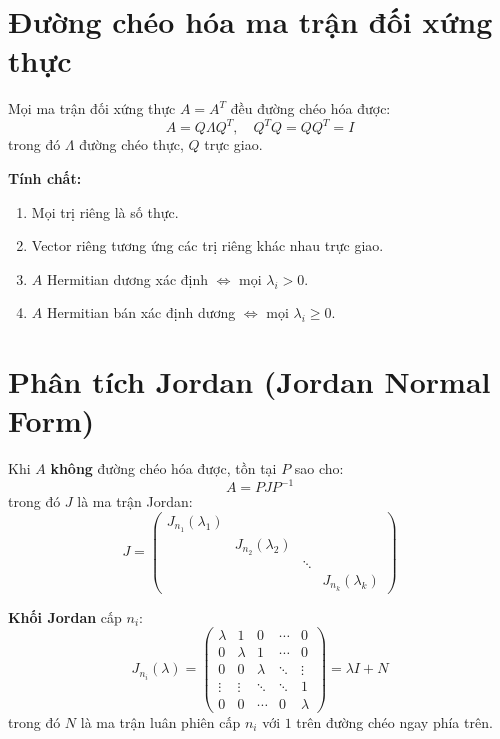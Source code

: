 \section{Đường chéo hóa ma trận đối xứng thực}

Mọi ma trận đối xứng thực $A = A^T$ đều đường chéo hóa được:
\[
A = Q\Lambda Q^T, \quad Q^TQ = QQ^T = I
\]
trong đó $\Lambda$ đường chéo thực, $Q$ trực giao.

\textbf{Tính chất:}
\begin{enumerate}
    \item Mọi trị riêng là số thực.
    \item Vector riêng tương ứng các trị riêng khác nhau trực giao.
    \item $A$ Hermitian dương xác định $\Longleftrightarrow$ mọi $\lambda_i > 0$.
    \item $A$ Hermitian bán xác định dương $\Longleftrightarrow$ mọi $\lambda_i \ge 0$.
\end{enumerate}

\section{Phân tích Jordan (Jordan Normal Form)}

Khi $A$ \textbf{không} đường chéo hóa được, tồn tại $P$ sao cho:
\[
A = PJP^{-1}
\]
trong đó $J$ là ma trận Jordan:
\[
J = \begin{pmatrix}
J_{n_1}(\lambda_1) & & \\
& J_{n_2}(\lambda_2) & \\
& & \ddots \\
& & & J_{n_k}(\lambda_k)
\end{pmatrix}
\]

\textbf{Khối Jordan} cấp $n_i$:
\[
J_{n_i}(\lambda) = \begin{pmatrix}
\lambda & 1 & 0 & \cdots & 0 \\
0 & \lambda & 1 & \cdots & 0 \\
0 & 0 & \lambda & \ddots & \vdots \\
\vdots & \vdots & \ddots & \ddots & 1 \\
0 & 0 & \cdots & 0 & \lambda
\end{pmatrix}
= \lambda I + N
\]
trong đó $N$ là ma trận luân phiên cấp $n_i$ với $1$ trên đường chéo ngay phía trên.

